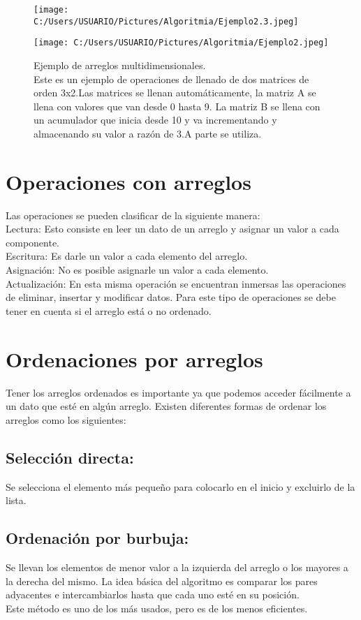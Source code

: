 \documentclass[journal]{IEEEtran}
\begin{document}
\begin{figure}[!]
\centering
\texttt{[image: C:/Users/USUARIO/Pictures/Algoritmia/Ejemplo2.3.jpeg]}
\caption{}
\label{figure_sim}
\end{figure}

\begin{figure}[!]
\centering
\texttt{[image: C:/Users/USUARIO/Pictures/Algoritmia/Ejemplo2.jpeg]}
\caption{Ejemplo de arreglos multidimensionales.\\Este es un ejemplo de operaciones de llenado de dos matrices de orden 3x2.Las matrices se llenan automáticamente, la matriz A se llena con valores que van desde 0 hasta 9. La matriz B se llena con un acumulador que inicia desde 10 y va incrementando y almacenando su valor a razón de 3.A parte se utiliza.}
\label{figure_sim}
\end{figure}


\section{Operaciones con arreglos}
Las operaciones se pueden clasificar de la siguiente manera:\\
Lectura: Esto consiste en leer un dato de un arreglo y asignar un valor a cada componente.\\
Escritura: Es darle un valor a cada elemento del arreglo.\\
Asignación: No es posible asignarle un valor a cada elemento.\\
Actualización: En esta misma operación se encuentran inmersas las operaciones de eliminar, insertar y modificar datos. Para este tipo de operaciones se debe tener en cuenta si el arreglo está o no ordenado.

\section{Ordenaciones por arreglos}
Tener los arreglos ordenados es importante ya que podemos acceder fácilmente a un dato que esté en algún arreglo. Existen diferentes formas de ordenar los arreglos como los siguientes:\\
\subsection{Selección directa:} Se selecciona el elemento más pequeño para colocarlo en el inicio y excluirlo de la lista.\\
\subsection{Ordenación por burbuja:} Se llevan los elementos de menor valor a la izquierda del arreglo o los mayores a la derecha del mismo. La idea básica del algoritmo es comparar los pares adyacentes e intercambiarlos hasta que cada uno esté en su posición.\\
Este método es uno de los más usados, pero es de los menos eficientes.\\
\end{document}
